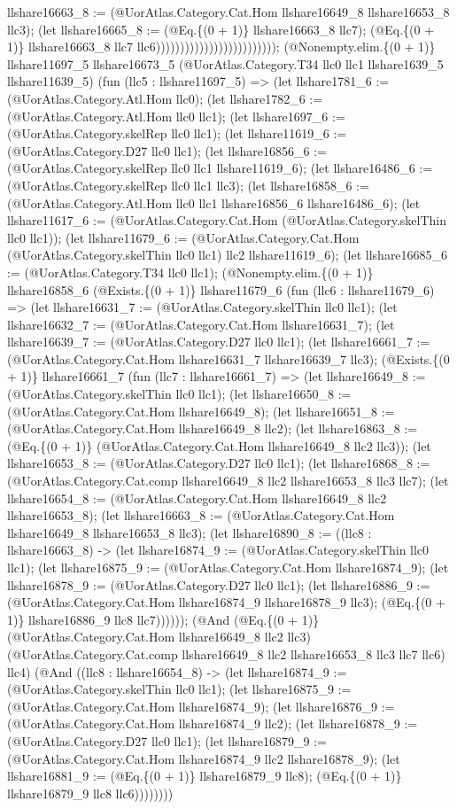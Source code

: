 \documentclass[11pt]{article}
\begin{document}
llshare16663\_8 := (@UorAtlas.Category.Cat.Hom llshare16649\_8 llshare16653\_8 llc3); (let llshare16665\_8 := (@Eq.\{(0 + 1)\} llshare16663\_8 llc7); (@Eq.\{(0 + 1)\} llshare16663\_8 llc7 llc6))))))))))))))))))))))))); (@Nonempty.elim.\{(0 + 1)\} llshare11697\_5 llshare16673\_5 (@UorAtlas.Category.T34 llc0 llc1 llshare1639\_5 llshare11639\_5) (fun (llc5 : llshare11697\_5) => (let llshare1781\_6 := (@UorAtlas.Category.Atl.Hom llc0); (let llshare1782\_6 := (@UorAtlas.Category.Atl.Hom llc0 llc1); (let llshare1697\_6 := (@UorAtlas.Category.skelRep llc0 llc1); (let llshare11619\_6 := (@UorAtlas.Category.D27 llc0 llc1); (let llshare16856\_6 := (@UorAtlas.Category.skelRep llc0 llc1 llshare11619\_6); (let llshare16486\_6 := (@UorAtlas.Category.skelRep llc0 llc1 llc3); (let llshare16858\_6 := (@UorAtlas.Category.Atl.Hom llc0 llc1 llshare16856\_6 llshare16486\_6); (let llshare11617\_6 := (@UorAtlas.Category.Cat.Hom (@UorAtlas.Category.skelThin llc0 llc1)); (let llshare11679\_6 := (@UorAtlas.Category.Cat.Hom (@UorAtlas.Category.skelThin llc0 llc1) llc2 llshare11619\_6); (let llshare16685\_6 := (@UorAtlas.Category.T34 llc0 llc1); (@Nonempty.elim.\{(0 + 1)\} llshare16858\_6 (@Exists.\{(0 + 1)\} llshare11679\_6 (fun (llc6 : llshare11679\_6) => (let llshare16631\_7 := (@UorAtlas.Category.skelThin llc0 llc1); (let llshare16632\_7 := (@UorAtlas.Category.Cat.Hom llshare16631\_7); (let llshare16639\_7 := (@UorAtlas.Category.D27 llc0 llc1); (let llshare16661\_7 := (@UorAtlas.Category.Cat.Hom llshare16631\_7 llshare16639\_7 llc3); (@Exists.\{(0 + 1)\} llshare16661\_7 (fun (llc7 : llshare16661\_7) => (let llshare16649\_8 := (@UorAtlas.Category.skelThin llc0 llc1); (let llshare16650\_8 := (@UorAtlas.Category.Cat.Hom llshare16649\_8); (let llshare16651\_8 := (@UorAtlas.Category.Cat.Hom llshare16649\_8 llc2); (let llshare16863\_8 := (@Eq.\{(0 + 1)\} (@UorAtlas.Category.Cat.Hom llshare16649\_8 llc2 llc3)); (let llshare16653\_8 := (@UorAtlas.Category.D27 llc0 llc1); (let llshare16868\_8 := (@UorAtlas.Category.Cat.comp llshare16649\_8 llc2 llshare16653\_8 llc3 llc7); (let llshare16654\_8 := (@UorAtlas.Category.Cat.Hom llshare16649\_8 llc2 llshare16653\_8); (let llshare16663\_8 := (@UorAtlas.Category.Cat.Hom llshare16649\_8 llshare16653\_8 llc3); (let llshare16890\_8 := ((llc8 : llshare16663\_8) -> (let llshare16874\_9 := (@UorAtlas.Category.skelThin llc0 llc1); (let llshare16875\_9 := (@UorAtlas.Category.Cat.Hom llshare16874\_9); (let llshare16878\_9 := (@UorAtlas.Category.D27 llc0 llc1); (let llshare16886\_9 := (@UorAtlas.Category.Cat.Hom llshare16874\_9 llshare16878\_9 llc3); (@Eq.\{(0 + 1)\} llshare16886\_9 llc8 llc7)))))); (@And (@Eq.\{(0 + 1)\} (@UorAtlas.Category.Cat.Hom llshare16649\_8 llc2 llc3) (@UorAtlas.Category.Cat.comp llshare16649\_8 llc2 llshare16653\_8 llc3 llc7 llc6) llc4) (@And ((llc8 : llshare16654\_8) -> (let llshare16874\_9 := (@UorAtlas.Category.skelThin llc0 llc1); (let llshare16875\_9 := (@UorAtlas.Category.Cat.Hom llshare16874\_9); (let llshare16876\_9 := (@UorAtlas.Category.Cat.Hom llshare16874\_9 llc2); (let llshare16878\_9 := (@UorAtlas.Category.D27 llc0 llc1); (let llshare16879\_9 := (@UorAtlas.Category.Cat.Hom llshare16874\_9 llc2 llshare16878\_9); (let llshare16881\_9 := (@Eq.\{(0 + 1)\} llshare16879\_9 llc8); (@Eq.\{(0 + 1)\} llshare16879\_9 llc8 llc6)))))))) 
\end{document}
